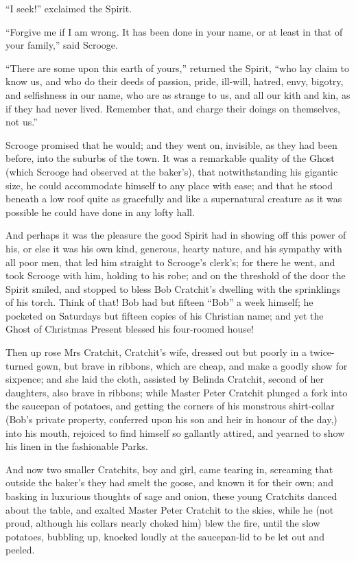 \documentclass[paper=5.5in:8.5in,BCOR=7mm,twoside,DIV=calc,12pt,usegeometry]{scrbook} %
\begin{document}
\enquote{I seek!} exclaimed the Spirit.

\enquote{Forgive me if I am wrong. It has been done in your name, or at least in that of your family,} said Scrooge.

\enquote{There are some upon this earth of yours,} returned the Spirit, \enquote{who lay claim to know us, and who do their deeds of passion, pride, ill-will, hatred, envy, bigotry, and selfishness in our name, who are as strange to us, and all our kith and kin, as if they had never lived. Remember that, and charge their doings on themselves, not us.}


Scrooge promised that he would; and they went on, invisible, as they had been before, into the suburbs of the town. It was a remarkable quality of the Ghost (which Scrooge had observed at the baker's), that notwithstanding his gigantic size, he could accommodate himself to any place with ease; and that he stood beneath a low roof quite as gracefully and like a supernatural creature as it was possible he could have done in any lofty hall.



And perhaps it was the pleasure the good Spirit had in showing off this power of his, or else it was his own kind, generous, hearty nature, and his sympathy with all poor men, that led him straight to Scrooge's clerk's; for there he went, and took Scrooge with him, holding to his robe; and on the threshold of the door the Spirit smiled, and stopped to bless Bob Cratchit's dwelling with the sprinklings of his torch. Think of that! Bob had but fifteen \enquote{Bob} a week himself; he pocketed on Saturdays but fifteen copies of his Christian name; and yet the Ghost of Christmas Present blessed his four-roomed house!



Then up rose Mrs Cratchit, Cratchit's wife, dressed out but poorly in a twice-turned gown, but brave in ribbons, which are cheap, and make a goodly show for sixpence; and she laid the cloth, assisted by Belinda Cratchit, second of her daughters, also brave in ribbons; while Master Peter Cratchit plunged a fork into the saucepan of potatoes, and getting the corners of his monstrous shirt-collar (Bob's private property, conferred upon his son and heir in honour of the day,) into his mouth, rejoiced to find himself so gallantly attired, and yearned to show his linen in the fashionable Parks. 

And now two smaller Cratchits, boy and girl, came tearing in, screaming that outside the baker's they had smelt the goose, and known it for their own; and basking in luxurious thoughts of sage and onion, these young Cratchits danced about the table, and exalted Master Peter Cratchit to the skies, while he (not proud, although his collars nearly choked him) blew the fire, until the slow potatoes, bubbling up, knocked loudly at the saucepan-lid to be let out and peeled.
\end{document}
